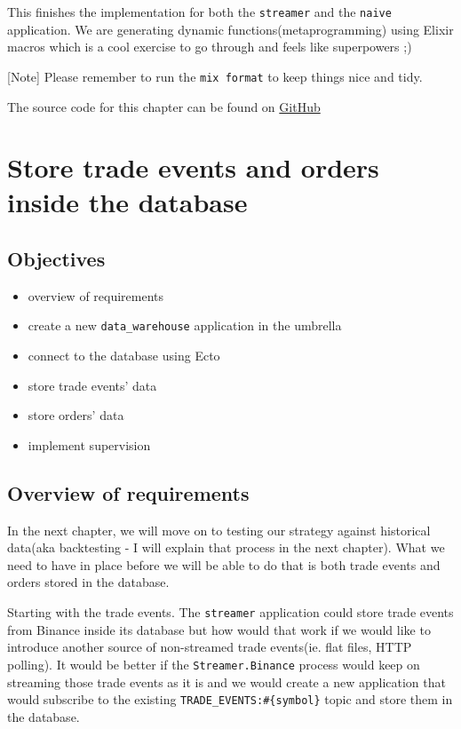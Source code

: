 \documentclass[
  oneside]{book}
\providecommand{\tightlist}{%
  \setlength{\itemsep}{0pt}\setlength{\parskip}{0pt}}
\begin{document}
This finishes the implementation for both the \texttt{streamer} and the \texttt{naive} application. We are generating dynamic functions(metaprogramming) using Elixir macros which is a cool exercise to go through and feels like superpowers ;)

{[}Note{]} Please remember to run the \texttt{mix\ format} to keep things nice and tidy.

The source code for this chapter can be found on \href{https://github.com/Cinderella-Man/hands-on-elixir-and-otp-cryptocurrency-trading-bot-source-code/tree/chapter_13}{GitHub}

\chapter{Store trade events and orders inside the database}\label{store-trade-events-and-orders-inside-the-database}

\section{Objectives}\label{objectives-13}

\begin{itemize}
\tightlist
\item
  overview of requirements
\item
  create a new \texttt{data\_warehouse} application in the umbrella
\item
  connect to the database using Ecto
\item
  store trade events' data
\item
  store orders' data
\item
  implement supervision
\end{itemize}

\section{Overview of requirements}\label{overview-of-requirements-1}

In the next chapter, we will move on to testing our strategy against historical data(aka backtesting - I will explain that process in the next chapter). What we need to have in place before we will be able to do that is both trade events and orders stored in the database.

Starting with the trade events. The \texttt{streamer} application could store trade events from Binance inside its database but how would that work if we would like to introduce another source of non-streamed trade events(ie. flat files, HTTP polling). It would be better if the \texttt{Streamer.Binance} process would keep on streaming those trade events as it is and we would create a new application that would subscribe to the existing \texttt{TRADE\_EVENTS:\#\{symbol\}} topic and store them in the database.
\end{document}
